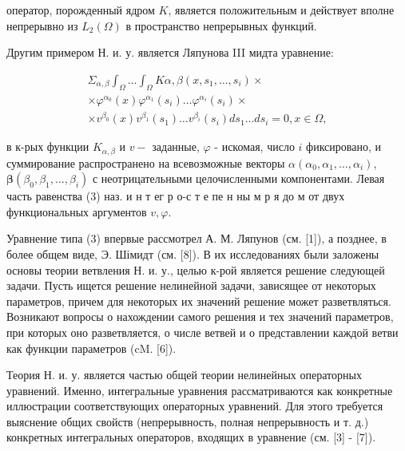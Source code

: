 \documentclass[10pt]{article}
\begin{document}
оператор, порожденный ядром $K$, является положительным и действует вполне непрерывно из $L_{2}(\Omega)$ в пространство непрерывных функций.



Другим примером Н. и. у. является Ляпунова III мидта уравнение:



\[

\begin{gathered}

\Sigma_{\alpha, \beta} \int_{\Omega} \ldots \int_{\Omega} K \alpha, \beta\left(x, s_{1}, \ldots, s_{i}\right) \times \\

\times \varphi^{\alpha_{0}}(x) \varphi^{\alpha_{1}}\left(s_{i}\right) \ldots \varphi^{\alpha_{i}}\left(s_{i}\right) \times \\

\times v^{\beta_{0}}(x) v^{\beta_{1}}\left(s_{1}\right) \ldots v^{\beta_{i}}\left(s_{i}\right) d s_{1} \ldots d s_{i}=0, x \in \Omega,

\end{gathered}

\]



в к-рых функции $K_{\alpha, \beta}$ и $v-$ заданные, $\varphi$ - искомая, число $i$ фиксировано, и суммирование распространено на всевозможные векторы $\alpha\left(\alpha_{0}, \alpha_{1}, \ldots, \alpha_{i}\right)$, $\boldsymbol{\beta}\left(\beta_{0}, \beta_{1}, \ldots, \beta_{i}\right)$ с неотрицательными целочисленными компонентами. Левая часть равенства (3) наз. и н т ег р о-с т е пе н ны м р я до м от двух функциональных аргументов $v, \varphi$.



Уравнение типа (3) впервые рассмотрел А. М. Ляпунов (см. [1]), а позднее, в более общем виде, Э. Шімидт (см. [8]). В их исследованиях были заложены основы теории ветвления Н. и. у., целью к-рой является решение следующей задачи. Пусть ищется решение нелинейной задачи, зависящее от некоторых параметров, причем для некоторых их значений решение может разветвляться. Возникают вопросы о нахождении самого решения и тех значений параметров, при которых оно разветвляется, о числе ветвей и о представлении каждой ветви как функции параметров (cM. [6]).



Теория Н. и. у. является частью общей теории нелинейных операторных уравнений. Именно, интегральные уравнения рассматриваются как конкретные иллюстрации соответствующих операторных уравнений. Для этого требуется выяснение общих свойств (непрерывность, полная непрерывность и т. д.) конкретных интегральных операторов, входящих в уравнение (см. [3] - [7]).
\end{document}
